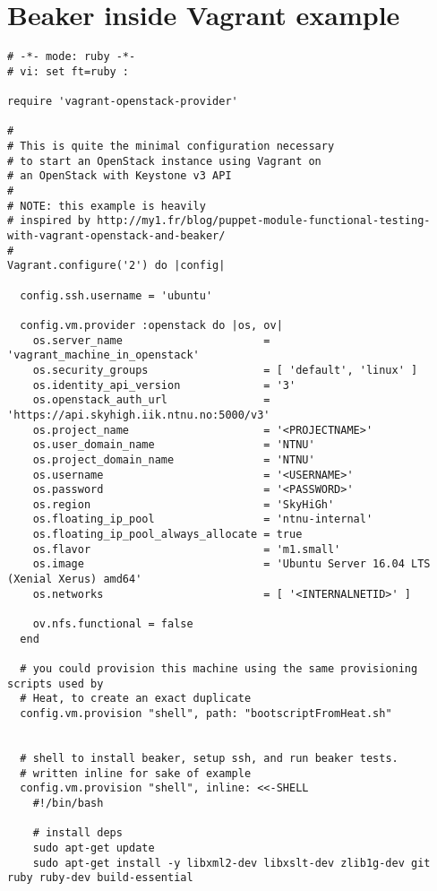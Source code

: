\section{Beaker inside Vagrant example} \label{beakerinsidevagrantexample}

\begin{verbatim}
# -*- mode: ruby -*-
# vi: set ft=ruby :

require 'vagrant-openstack-provider'

#
# This is quite the minimal configuration necessary
# to start an OpenStack instance using Vagrant on
# an OpenStack with Keystone v3 API
#
# NOTE: this example is heavily
# inspired by http://my1.fr/blog/puppet-module-functional-testing-with-vagrant-openstack-and-beaker/
#
Vagrant.configure('2') do |config|

  config.ssh.username = 'ubuntu'

  config.vm.provider :openstack do |os, ov|
    os.server_name                      = 'vagrant_machine_in_openstack'
    os.security_groups                  = [ 'default', 'linux' ]
    os.identity_api_version             = '3'
    os.openstack_auth_url               = 'https://api.skyhigh.iik.ntnu.no:5000/v3'
    os.project_name                     = '<PROJECTNAME>'
    os.user_domain_name                 = 'NTNU'
    os.project_domain_name              = 'NTNU'
    os.username                         = '<USERNAME>'
    os.password                         = '<PASSWORD>'
    os.region                           = 'SkyHiGh'
    os.floating_ip_pool                 = 'ntnu-internal'
    os.floating_ip_pool_always_allocate = true
    os.flavor                           = 'm1.small'
    os.image                            = 'Ubuntu Server 16.04 LTS (Xenial Xerus) amd64'
    os.networks                         = [ '<INTERNALNETID>' ]

    ov.nfs.functional = false
  end

  # you could provision this machine using the same provisioning scripts used by 
  # Heat, to create an exact duplicate
  config.vm.provision "shell", path: "bootscriptFromHeat.sh"
  

  # shell to install beaker, setup ssh, and run beaker tests.
  # written inline for sake of example
  config.vm.provision "shell", inline: <<-SHELL
    #!/bin/bash

    # install deps
    sudo apt-get update
    sudo apt-get install -y libxml2-dev libxslt-dev zlib1g-dev git ruby ruby-dev build-essential


\end{verbatim}
